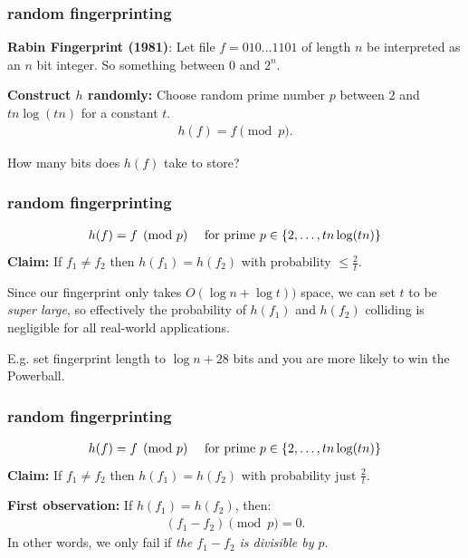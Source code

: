 \documentclass[compress]{beamer}
\begin{document}
\begin{frame}
	\frametitle{random fingerprinting}
	\textbf{Rabin Fingerprint (1981)}: Let file $f = 010\ldots1101$ of length $n$ be interpreted as an $n$ bit integer. So something between $0$ and $2^n$. 
	
	\textbf{Construct $h$ randomly:} Choose random prime number $p$  between $2$ and $tn\log(tn)$ for a constant $t$.
	\begin{align*}
		h(f) = f \pmod{p}.
	\end{align*} 
	
	\begin{center}
		How many bits does $h(f)$ take to store?
	\end{center}
	
\end{frame}

\begin{frame}[t]
	\frametitle{random fingerprinting}
	\begin{align*}
		h(f) = f \pmod{p} \text{\hspace{1em} for prime } p\in \{2, \ldots, tn\log(tn)\}
	\end{align*} 
	\textbf{Claim:} If $f_1\neq f_2$ then $h(f_1) = h(f_2)$ with probability  $\leq \frac{2}{t}$.
	\vspace{3em}
	
	Since our fingerprint only takes $O(\log n + \log t))$ space,   we can  set $t$ to be \emph{super large}, so effectively the probability of $h(f_1)$ and $h(f_2)$ colliding is negligible for all real-world applications.
	
	E.g. set fingerprint length to $\log n + 28$ bits and you are more likely to win the Powerball.
\end{frame}


\begin{frame}[t]
	\frametitle{random fingerprinting}
	\begin{align*}
		h(f) = f \pmod{p} \text{\hspace{1em} for prime } p\in \{2, \ldots, tn\log(tn)\}
	\end{align*} 
	\textbf{Claim:} If $f_1\neq f_2$ then $h(f_1) = h(f_2)$ with probability just $\frac{2}{t}$.
	\vspace{3em}
	
	\textbf{First observation:} If $h(f_1) = h(f_2)$, then:
	\begin{align*}
		(f_1 - f_2) \pmod{p} = 0. 
	\end{align*}
	In other words, we only fail if \emph{the $f_1 - f_2$ is divisible by $p$}.
	
	
\end{frame}
\end{document}
